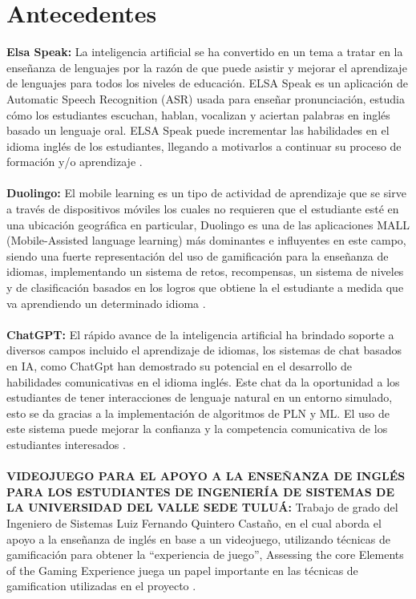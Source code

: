 \newpage
\section{Antecedentes}

\textbf{Elsa Speak: }
La inteligencia artificial se ha convertido en un tema a tratar en la enseñanza de  lenguajes por la razón de que puede asistir y mejorar el aprendizaje de lenguajes para todos los niveles de educación. ELSA Speak es un aplicación de Automatic Speech Recognition (ASR) usada para enseñar pronunciación, estudia cómo los estudiantes escuchan, hablan, vocalizan y aciertan palabras en inglés basado un lenguaje oral. ELSA Speak puede incrementar las habilidades en el idioma inglés de los estudiantes, llegando a motivarlos a continuar su proceso de formación y/o aprendizaje \cite{kholis2021elsa}.
\\
\\
\textbf{Duolingo: }
El mobile learning es un tipo de actividad de aprendizaje que se sirve a través de dispositivos móviles los cuales no requieren que el estudiante esté en una ubicación geográfica en particular, Duolingo es una de las aplicaciones MALL (Mobile-Assisted language learning) más dominantes e influyentes en este campo, siendo una fuerte representación del uso de gamificación para la enseñanza de idiomas, implementando un sistema de retos, recompensas,  un sistema de niveles y de clasificación basados en los logros que obtiene la el estudiante a medida que va aprendiendo un determinado idioma \cite{shortt2023gamification}.
\\
\\
\textbf{ChatGPT: }
El rápido avance de la inteligencia artificial ha brindado soporte a diversos campos incluido el aprendizaje de idiomas, los sistemas de chat basados en IA, como ChatGpt han demostrado su potencial en el desarrollo de habilidades comunicativas en el idioma inglés. Este chat da la oportunidad a los estudiantes de tener interacciones de lenguaje natural en un entorno simulado, esto se da gracias a la implementación de algoritmos de PLN y ML. El uso de este sistema puede mejorar la confianza y la competencia comunicativa de los estudiantes interesados \cite{chicaiza2023aplicaciones}.
\\
\\
\textbf{VIDEOJUEGO PARA EL APOYO A LA ENSEÑANZA DE INGLÉS PARA LOS ESTUDIANTES DE INGENIERÍA DE SISTEMAS DE LA UNIVERSIDAD DEL VALLE SEDE TULUÁ:  }
Trabajo de grado del Ingeniero de Sistemas Luiz Fernando Quintero Castaño, en el cual aborda el apoyo a la enseñanza de inglés en base a un videojuego, utilizando técnicas de gamificación para obtener la “experiencia de juego”, Assessing the core Elements of the Gaming Experience \cite{calvillo2015assessing} juega un papel importante en las técnicas de gamification utilizadas en el proyecto \cite{quintero2018videojuego}.

